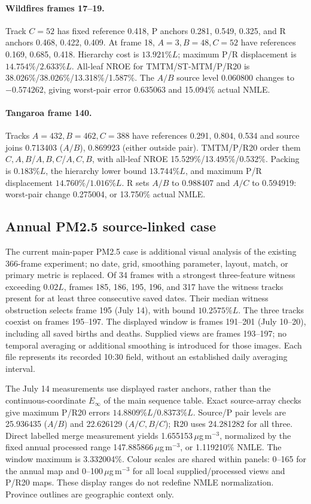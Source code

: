 \paragraph{Wildfires frames 17--19.} Track $C=52$ has fixed reference 0.418, P anchors 0.281, 0.549, 0.325, and R anchors 0.468, 0.422, 0.409. At frame 18, $A=3,B=48,C=52$ have references 0.169, 0.685, 0.418. Hierarchy cost is $13.921\%L$; maximum P/R displacement is $14.754\%/2.633\%L$. All-leaf NROE for TMTM/ST-MTM/P/R20 is 38.026\%/38.026\%/13.318\%/1.587\%. The $A/B$ source level 0.060800 changes to $-0.574262$, giving worst-pair error 0.635063 and 15.094\% actual NMLE.

\begin{samepage}
\paragraph{Tangaroa frame 140.} Tracks $A=432,B=462,C=388$ have references 0.291, 0.804, 0.534 and source joins 0.713403 ($A/B$), 0.869923 (either outside pair). TMTM/P/R20 order them $C,A,B$/$A,B,C$/$A,C,B$, with all-leaf NROE 15.529\%/13.495\%/0.532\%. Packing is $0.183\%L$, the hierarchy lower bound $13.744\%L$, and maximum P/R displacement $14.760\%/1.016\%L$. R sets $A/B$ to 0.988407 and $A/C$ to 0.594919: worst-pair change 0.275004, or 13.750\% actual NMLE.
\end{samepage}

\subsection{Annual PM2.5 source-linked case}
The current main-paper PM2.5 case is additional visual analysis of the existing 366-frame experiment; no date, grid, smoothing parameter, layout, match, or primary metric is replaced. Of 34 frames with a strongest three-feature witness exceeding $0.02L$, frames 185, 186, 195, 196, and 317 have the witness tracks present for at least three consecutive saved dates. Their median witness obstruction selects frame 195 (July 14), with bound $10.2575\%L$. The three tracks coexist on frames 195--197. The displayed window is frames 191--201 (July 10--20), including all saved births and deaths. Supplied views are frames 193--197; no temporal averaging or additional smoothing is introduced for those images. Each file represents its recorded 10:30 field, without an established daily averaging interval.

The July 14 measurements use displayed raster anchors, rather than the continuous-coordinate $E_\infty$ of the main sequence table. Exact source-array checks give maximum P/R20 errors $14.8809\%L$/$0.8373\%L$. Source/P pair levels are 25.936435 ($A/B$) and 22.626129 ($A/C,B/C$); R20 uses 24.281282 for all three. Direct labelled merge measurement yields 1.655153\,$\mu$g\,m$^{-3}$, normalized by the fixed annual processed range 147.885866\,$\mu$g\,m$^{-3}$, or 1.119210\% NMLE. The window maximum is 3.332004\%. Colour scales are shared within panels: 0--165 for the annual map and 0--100\,$\mu$g\,m$^{-3}$ for all local supplied/processed views and P/R20 maps. These display ranges do not redefine NMLE normalization. Province outlines are geographic context only.

